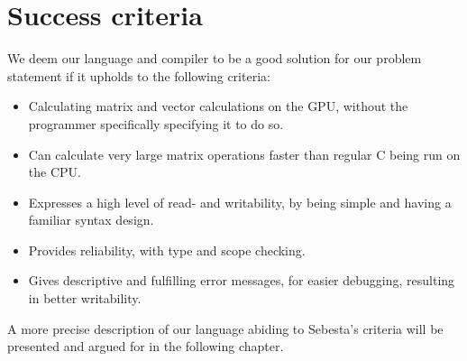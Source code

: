 \section{Success criteria}\label{sec:OurCriterias}
We deem our language and compiler to be a good solution for our problem statement if it upholds to the following criteria:

\begin{itemize}
	\item Calculating matrix and vector calculations on the GPU, without the programmer specifically specifying it to do so.
	\item Can calculate very large matrix operations faster than regular C being run on the CPU.
	\item Expresses a high level of read- and writability, by being simple and having a familiar syntax design.
	\item Provides reliability, with type and scope checking.
	\item Gives descriptive and fulfilling error messages, for easier debugging, resulting in better writability.
\end{itemize}

A more precise description of our language abiding to Sebesta's criteria will be presented and argued for in the following chapter.
